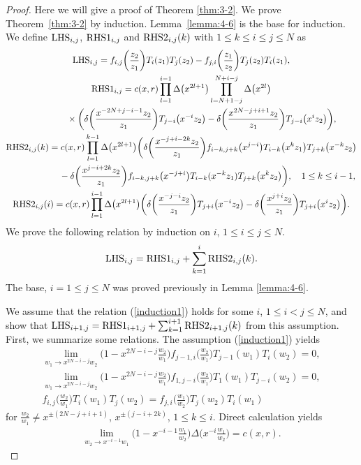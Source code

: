 \documentclass[10pt,a4paper]{amsart}
\numberwithin{equation}{section}
\begin{document}
\begin{proof}
Here we will give a proof of Theorem \ref{thm:3-2}.
We prove Theorem~\ref{thm:3-2} by induction.
Lem\-ma~\ref{lemma:4-6} is the base for induction.
We define ${\rm LHS}_{i,j}$, ${\rm RHS1}_{i,j}$ and ${\rm RHS2}_{i,j}(k)$
with $1\leq k \leq i \leq j \leq N$ as
\begin{gather*}
{\rm LHS}_{i,j}=
f_{i,j}\bigg(\frac{z_2}{z_1}\bigg)T_i(z_1)T_j(z_2)
-f_{j,i}\bigg(\frac{z_1}{z_2}\bigg)T_j(z_2)T_i(z_1),
\\
{\rm RHS1}_{i,j}=c(x,r)\prod_{l=1}^{i-1}
\Delta\big(x^{2l+1}\big)\prod_{l=N+1-j}^{N+i-j}\Delta\big(x^{2l}\big)
\\ \hphantom{{\rm RHS1}_{i,j}=}
{}\times\bigg(\delta\bigg(\frac{x^{-2N+j-i-1}z_2}{z_1}\bigg)
T_{j-i}\big(x^{-i}z_2\big)-\delta
\bigg(\frac{x^{2N-j+i+1}z_2}{z_1}\bigg)T_{j-i}\big(x^{i}z_2\big)\bigg),
\\
{\rm RHS2}_{i,j}(k)=c(x,r)\prod_{l=1}^{k-1}\Delta\big(x^{2l+1}\big)
\bigg(\delta\bigg(\frac{x^{-j+i-2k}z_2}{z_1}\bigg)
f_{i-k,j+k}\big(x^{j-i}\big)T_{i-k}\big(x^kz_1\big)T_{j+k}\big(x^{-k}z_2\big)
\\ \hphantom{{\rm RHS2}_{i,j}(k)=}
{}-\delta\bigg(\frac{x^{j-i+2k}z_2}{z_1}\bigg)f_{i-k,j+k}\big(x^{-j+i}\big)
T_{i-k}(x^{-k}z_1)T_{j+k}\big(x^{k}z_2\big)\bigg),\quad
1\leq k \leq i-1,
\\
{\rm RHS2}_{i,j}(i)=c(x,r)\prod_{l=1}^{i-1}\Delta\big(x^{2l+1}\big)
\bigg(\delta\bigg(\frac{x^{-j-i}z_2}{z_1}\bigg)T_{j+i}\big(x^{-i}z_2\big)-
\delta\bigg(\frac{x^{j+i}z_2}{z_1}\bigg)T_{j+i}\big(x^{i}z_2\big)\bigg).
\end{gather*}
We prove the following relation by induction on
$i$, $1\leq i \leq j \leq N$.
\begin{gather}
{\rm LHS}_{i,j}={\rm RHS1}_{i,j}+\sum_{k=1}^i {\rm RHS2}_{i,j}(k).
\label{induction1}
\end{gather}
The base, $i=1 \leq j \leq N$ was proved previously in
Lemma \ref{lemma:4-6}.

We assume that the relation (\ref{induction1}) holds for
some $i$, $1\leq i<j\leq N$, and show that
${\rm LHS}_{i+1,j}={\rm RHS1}_{i+1,j}+\sum_{k=1}^{i+1} {\rm RHS2}_{i+1,j}(k)$ from this assumption.
First, we summarize some relations.
The assumption (\ref{induction1}) yields
\begin{gather}
\lim_{w_1 \to x^{2N-i-j}w_2}
\bigg(1-x^{2N-i-j}\frac{w_2}{w_1}\bigg)f_{j-1,i}\bigg(\frac{w_2}{w_1}\bigg)
T_{j-1}(w_1)T_i(w_2)=0,\label{induction2}
\\
\lim_{w_1 \to x^{2N-i-j}w_2}
\bigg(1-x^{2N-i-j}\frac{w_2}{w_1}\bigg)f_{1,j-i}\bigg(\frac{w_2}{w_1}\bigg)
T_{1}(w_1)T_{j-i}(w_2)=0,\label{induction3}
\\
f_{i,j}\bigg(\frac{w_2}{w_1}\bigg)T_i(w_1)T_j(w_2)=
f_{j,i}\bigg(\frac{w_1}{w_2}\bigg)T_j(w_2)T_i(w_1)
\label{induction4}
\end{gather}
for $\frac{w_2}{w_1}\neq x^{\pm (2N-j+i+1)}$, $x^{\pm(j-i+2k)}$, $1\leq k \leq i$.
Direct calculation yields
\begin{gather}
\lim_{w_2 \to x^{-i-1}w_1}
\bigg(1-x^{-i-1}\frac{w_1}{w_2}\bigg)\Delta\bigg(x^{-i}\frac{w_1}{w_2}\bigg)=c(x,r).
\label{induction5}
\end{gather}


\end{proof}
\end{document}
